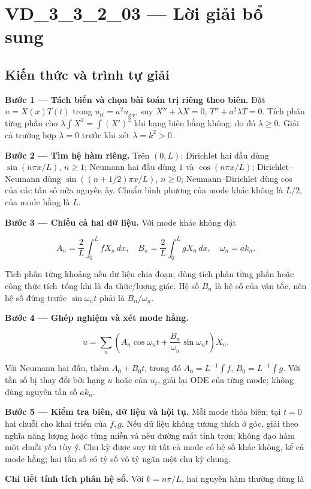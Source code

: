 \documentclass[10pt,a4paper]{article}
\begin{document}
\section*{VD\_3\_3\_2\_03 — Lời giải bổ sung}
\subsection*{Kiến thức và trình tự giải}
\textbf{Bước 1 — Tách biến và chọn bài toán trị riêng theo biên.} Đặt $u=X(x)T(t)$ trong $u_{tt}=a^2u_{xx}$, suy $X''+\lambda X=0$, $T''+a^2\lambda T=0$. Tích phân từng phần cho $\lambda\int X^2=\int (X')^2$ khi hạng biên bằng không; do đó $\lambda\ge0$. Giải cả trường hợp $\lambda=0$ trước khi xét $\lambda=k^2>0$.

\textbf{Bước 2 — Tìm hệ hàm riêng.} Trên $(0,L)$: Dirichlet hai đầu dùng $\sin(n\pi x/L)$, $n\ge1$; Neumann hai đầu dùng $1$ và $\cos(n\pi x/L)$; Dirichlet–Neumann dùng $\sin((n+1/2)\pi x/L)$, $n\ge0$; Neumann–Dirichlet dùng cos của các tần số nửa nguyên ấy. Chuẩn bình phương của mode khác không là $L/2$, của mode hằng là $L$.

\textbf{Bước 3 — Chiếu cả hai dữ liệu.} Với mode khác không đặt


\[
A_n=\frac2L\int_0^L fX_n\,dx,\quad B_n=\frac2L\int_0^L gX_n\,dx,\quad \omega_n=ak_n.
\]


Tích phân từng khoảng nếu dữ liệu chia đoạn; dùng tích phân từng phần hoặc công thức tích–tổng khi là đa thức/lượng giác. Hệ số $B_n$ là hệ số của vận tốc, nên hệ số đứng trước $\sin\omega_nt$ phải là $B_n/\omega_n$.

\textbf{Bước 4 — Ghép nghiệm và xét mode hằng.}


\[
u=\sum_n\left(A_n\cos\omega_nt+\frac{B_n}{\omega_n}\sin\omega_nt\right)X_n.
\]


Với Neumann hai đầu, thêm $A_0+B_0t$, trong đó $A_0=L^{-1}\int f$, $B_0=L^{-1}\int g$. Với tần số bị thay đổi bởi hạng $u$ hoặc cản $u_t$, giải lại ODE của từng mode; không dùng nguyên tần số $ak_n$.

\textbf{Bước 5 — Kiểm tra biên, dữ liệu và hội tụ.} Mỗi mode thỏa biên; tại $t=0$ hai chuỗi cho khai triển của $f,g$. Nếu dữ liệu không tương thích ở góc, giải theo nghĩa năng lượng hoặc từng miền và nêu đường mất tính trơn; không đạo hàm một chuỗi yếu tùy ý. Chu kỳ được suy từ tất cả mode có hệ số khác không, kể cả mode hằng; hai tần số có tỷ số vô tỷ ngăn một chu kỳ chung.

\textbf{Chi tiết tính tích phân hệ số.} Với $k=n\pi/L$, hai nguyên hàm thường dùng là
\end{document}
